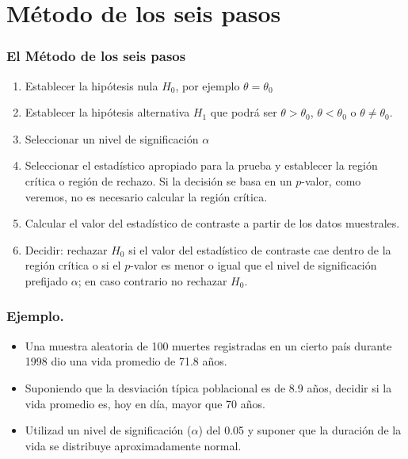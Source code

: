     \section{Método de los seis pasos}
\begin{frame}
    \frametitle{El Método de los seis pasos}

  \begin{enumerate}[1)]
      \item Establecer la hipótesis nula $H_{0}$, por ejemplo
      $\theta=\theta_{0}$
      \item Establecer la hipótesis alternativa $H_{1}$ que podrá ser
      $\theta>\theta_{0}$,  $\theta<\theta_{0}$ o
      $\theta\not=\theta_{0}$.
      \item Seleccionar un nivel de significación $\alpha$
      \item Seleccionar el estadístico apropiado para la prueba y
      establecer la región crítica o región de rechazo. Si la
      decisión se basa en un $p$-valor, como veremos, no es necesario
      calcular la región crítica.
      \item Calcular el valor del estadístico de contraste a partir
      de los datos muestrales.
      \item Decidir:  rechazar $H_{0}$ si el valor del estadístico de
      contraste cae dentro de la región crítica o si el $p$-valor es
      menor o igual que el nivel de significación prefijado $\alpha$;
      en caso contrario no rechazar $H_{0}$.
      \end{enumerate}
\end{frame}

\begin{frame}

    \frametitle{Ejemplo.}
\begin{itemize}
\item Una muestra aleatoria de 100 muertes registradas en un cierto país durante 1998 dio una vida promedio de 71.8 años.
\item  Suponiendo que la desviación típica poblacional es de 8.9 años, decidir si la
    vida promedio es, hoy en día, mayor que 70 años.
\item  Utilizad un nivel de significación ($\alpha$) del 0.05 y suponer que la duración de la vida se
    distribuye aproximadamente normal.
\end{itemize}
\end{frame}

